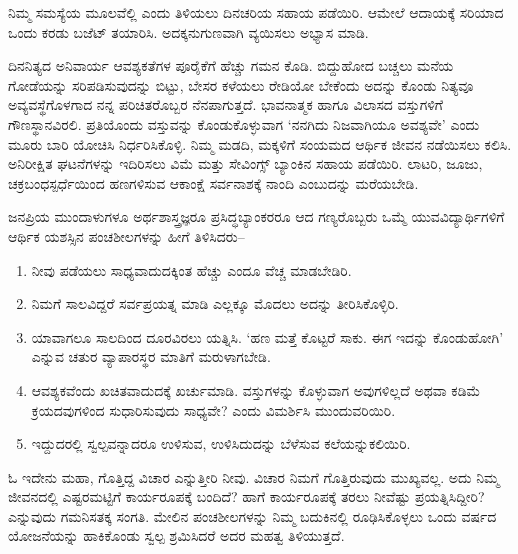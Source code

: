 \vskip 2pt

ನಿಮ್ಮ ಸಮಸ್ಯೆಯ ಮೂಲವೆಲ್ಲಿ ಎಂದು ತಿಳಿಯಲು ದಿನಚರಿಯ ಸಹಾಯ ಪಡೆಯಿರಿ. ಆಮೇಲೆ ಆದಾಯಕ್ಕೆ ಸರಿಯಾದ ಒಂದು ಕರಡು ಬಜೆಟ್ ತಯಾರಿಸಿ. ಅದಕ್ಕನುಗುಣವಾಗಿ ವ್ಯಯಿ\-ಸಲು ಅಭ್ಯಾಸ ಮಾಡಿ.

\vskip 2pt

ದಿನನಿತ್ಯದ ಅನಿವಾರ್ಯ ಆವಶ್ಯಕತೆಗಳ ಪೂರೈಕೆಗೆ ಹೆಚ್ಚು ಗಮನ ಕೊಡಿ. ಬಿದ್ದುಹೋದ ಬಚ್ಚಲು ಮನೆಯ ಗೋಡೆಯನ್ನು ಸರಿಪಡಿಸುವುದನ್ನು ಬಿಟ್ಟು, ಬೇಸರ ಕಳೆಯಲು ರೇಡಿಯೋ ಬೇಕೆಂದು ಅದನ್ನು ಕೊಂಡು ನಿತ್ಯವೂ ಅವ್ಯವಸ್ಥೆಗೊಳಗಾದ ನನ್ನ ಪರಿಚಿತರೊಬ್ಬರ ನೆನಪಾಗುತ್ತದೆ. ಭಾವನಾತ್ಮಕ ಹಾಗೂ ವಿಲಾಸದ ವಸ್ತುಗಳಿಗೆ ಗೌಣಸ್ಥಾನವಿರಲಿ. ಪ್ರತಿಯೊಂದು ವಸ್ತುವನ್ನು ಕೊಂಡುಕೊಳ್ಳುವಾಗ ‘ನನಗಿದು ನಿಜವಾಗಿಯೂ ಅವಶ್ಯವೇ’ ಎಂದು ಮೂರು ಬಾರಿ ಯೋಚಿಸಿ ನಿರ್ಧರಿಸಿಕೊಳ್ಳಿ. ನಿಮ್ಮ ಮಡದಿ, ಮಕ್ಕಳಿಗೆ ಸಂಯಮದ ಆರ್ಥಿಕ ಜೀವನ ನಡೆಯಿಸಲು ಕಲಿಸಿ. ಅನಿರೀಕ್ಷಿತ ಘಟನೆಗಳನ್ನು ಇದಿರಿಸಲು ವಿಮೆ ಮತ್ತು ಸೇವಿಂಗ್ಸ್ ಬ್ಯಾಂಕಿನ ಸಹಾಯ ಪಡೆಯಿರಿ. ಲಾಟರಿ, ಜೂಜು, ಚಕ್ರಬಂಧಸ್ಪರ್ಧೆಯಿಂದ ಹಣಗಳಿಸುವ ಆಕಾಂಕ್ಷೆ ಸರ್ವನಾಶಕ್ಕೆ ನಾಂದಿ ಎಂಬುದನ್ನು ಮರೆಯಬೇಡಿ.

\vskip 2pt

ಜನಪ್ರಿಯ ಮುಂದಾಳುಗಳೂ ಅರ್ಥಶಾಸ್ತ್ರಜ್ಞರೂ ಪ್ರಸಿದ್ಧಬ್ಯಾಂಕರರೂ ಆದ ಗಣ್ಯರೊಬ್ಬರು ಒಮ್ಮೆ ಯುವವಿದ್ಯಾರ್ಥಿಗಳಿಗೆ ಆರ್ಥಿಕ ಯಶಸ್ಸಿನ ಪಂಚಶೀಲಗಳನ್ನು ಹೀಗೆ ತಿಳಿಸಿದರು–

\bgroup\renewcommand{}

\begin{enumerate}
\itemsep=3pt
\item ನೀವು ಪಡೆಯಲು ಸಾಧ್ಯವಾದುದಕ್ಕಿಂತ ಹೆಚ್ಚು ಎಂದೂ ವೆಚ್ಚ ಮಾಡಬೇಡಿರಿ.

 \item ನಿಮಗೆ ಸಾಲವಿದ್ದರೆ ಸರ್ವಪ್ರಯತ್ನ ಮಾಡಿ ಎಲ್ಲಕ್ಕೂ ಮೊದಲು ಅದನ್ನು ತೀರಿಸಿಕೊಳ್ಳಿರಿ.

 \item ಯಾವಾಗಲೂ ಸಾಲದಿಂದ ದೂರವಿರಲು ಯತ್ನಿಸಿ. ‘ಹಣ ಮತ್ತೆ ಕೊಟ್ಟರೆ ಸಾಕು. ಈಗ ಇದನ್ನು ಕೊಂಡುಹೋಗಿ’ ಎನ್ನುವ ಚತುರ ವ್ಯಾಪಾರಸ್ಥರ ಮಾತಿಗೆ ಮರುಳಾಗಬೇಡಿ.

 \item ಆವಶ್ಯಕವೆಂದು ಖಚಿತವಾದುದಕ್ಕೆ ಖರ್ಚುಮಾಡಿ. ವಸ್ತುಗಳನ್ನು ಕೊಳ್ಳುವಾಗ ಅವುಗ\-ಳಿಲ್ಲದೆ ಅಥವಾ ಕಡಿಮೆ ಕ್ರಯದವುಗಳಿಂದ ಸುಧಾರಿಸುವುದು ಸಾಧ್ಯವೇ? ಎಂದು ವಿಮರ್ಶಿಸಿ ಮುಂದುವರಿಯಿರಿ.

 \item ಇದ್ದುದರಲ್ಲಿ ಸ್ವಲ್ಪವನ್ನಾದರೂ ಉಳಿಸುವ, ಉಳಿಸಿದುದನ್ನು ಬೆಳೆಸುವ ಕಲೆಯನ್ನು\break ಕಲಿಯಿರಿ.

\end{enumerate}

ಓ ಇದೇನು ಮಹಾ, ಗೊತ್ತಿದ್ದ ವಿಚಾರ ಎನ್ನುತ್ತೀರಿ ನೀವು. ವಿಚಾರ ನಿಮಗೆ ಗೊತ್ತಿರುವುದು ಮುಖ್ಯವಲ್ಲ. ಅದು ನಿಮ್ಮ ಜೀವನದಲ್ಲಿ ಎಷ್ಟರಮಟ್ಟಿಗೆ ಕಾರ್ಯರೂಪಕ್ಕೆ ಬಂದಿದೆ? ಹಾಗೆ ಕಾರ್ಯರೂಪಕ್ಕೆ ತರಲು ನೀವೆಷ್ಟು ಪ್ರಯತ್ನಿಸಿದ್ದೀರಿ? ಎನ್ನುವುದು ಗಮನಿಸತಕ್ಕ ಸಂಗತಿ. ಮೇಲಿನ ಪಂಚಶೀಲಗಳನ್ನು ನಿಮ್ಮ ಬದುಕಿನಲ್ಲಿ ರೂಢಿಸಿಕೊಳ್ಳಲು ಒಂದು ವರ್ಷದ ಯೋಜನೆಯನ್ನು ಹಾಕಿಕೊಂಡು ಸ್ವಲ್ಪ ಶ್ರಮಿಸಿದರೆ ಅದರ ಮಹತ್ವ ತಿಳಿಯುತ್ತದೆ.

